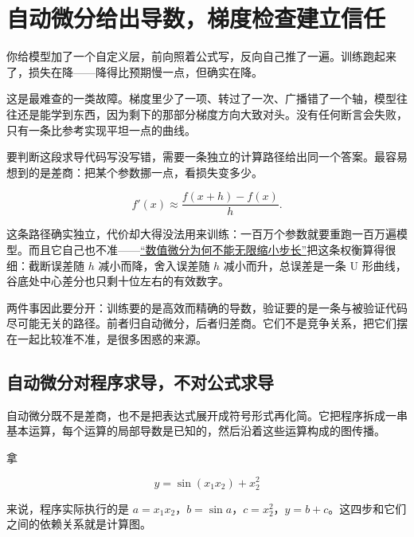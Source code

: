 \section{自动微分给出导数，梯度检查建立信任}
\label{sec:08-Numerical-Analysis/07-Numerical-Methods-for-ML/02}

你给模型加了一个自定义层，前向照着公式写，反向自己推了一遍。训练跑起来了，损失在降——降得比预期慢一点，但确实在降。

这是最难查的一类故障。梯度里少了一项、转过了一次、广播错了一个轴，模型往往还是能学到东西，因为剩下的那部分梯度方向大致对头。没有任何断言会失败，只有一条比参考实现平坦一点的曲线。

要判断这段求导代码写没写错，需要一条独立的计算路径给出同一个答案。最容易想到的是差商：把某个参数挪一点，看损失变多少。

\[
f'(x)\approx\frac{f(x+h)-f(x)}{h}.
\]

这条路径确实独立，代价却大得没法用来训练：一百万个参数就要重跑一百万遍模型。而且它自己也不准——\hyperref[sec:08-Numerical-Analysis/04-Numerical-Differentiation-and-Integration/01]{``数值微分为何不能无限缩小步长''}把这条权衡算得很细：截断误差随 \(h\) 减小而降，舍入误差随 \(h\) 减小而升，总误差是一条 U 形曲线，谷底处中心差分也只剩十位左右的有效数字。

两件事因此要分开：训练要的是高效而精确的导数，验证要的是一条与被验证代码尽可能无关的路径。前者归自动微分，后者归差商。它们不是竞争关系，把它们摆在一起比较准不准，是很多困惑的来源。

\subsection{自动微分对程序求导，不对公式求导}

自动微分既不是差商，也不是把表达式展开成符号形式再化简。它把程序拆成一串基本运算，每个运算的局部导数是已知的，然后沿着这些运算构成的图传播。

拿

\[
y=\sin(x_1x_2)+x_2^2
\]

来说，程序实际执行的是 \(a=x_1x_2\)，\(b=\sin a\)，\(c=x_2^2\)，\(y=b+c\)。这四步和它们之间的依赖关系就是计算图。

